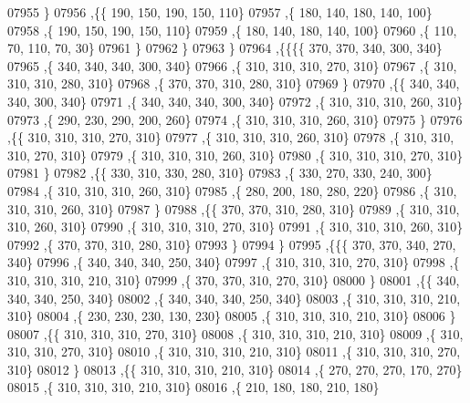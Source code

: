 \begin{DoxyCode}
07955     \}
07956    ,\{\{   190,   150,   190,   150,   110\}
07957     ,\{   180,   140,   180,   140,   100\}
07958     ,\{   190,   150,   190,   150,   110\}
07959     ,\{   180,   140,   180,   140,   100\}
07960     ,\{   110,    70,   110,    70,    30\}
07961     \}
07962    \}
07963   \}
07964  ,\{\{\{\{   370,   370,   340,   300,   340\}
07965     ,\{   340,   340,   340,   300,   340\}
07966     ,\{   310,   310,   310,   270,   310\}
07967     ,\{   310,   310,   310,   280,   310\}
07968     ,\{   370,   370,   310,   280,   310\}
07969     \}
07970    ,\{\{   340,   340,   340,   300,   340\}
07971     ,\{   340,   340,   340,   300,   340\}
07972     ,\{   310,   310,   310,   260,   310\}
07973     ,\{   290,   230,   290,   200,   260\}
07974     ,\{   310,   310,   310,   260,   310\}
07975     \}
07976    ,\{\{   310,   310,   310,   270,   310\}
07977     ,\{   310,   310,   310,   260,   310\}
07978     ,\{   310,   310,   310,   270,   310\}
07979     ,\{   310,   310,   310,   260,   310\}
07980     ,\{   310,   310,   310,   270,   310\}
07981     \}
07982    ,\{\{   330,   310,   330,   280,   310\}
07983     ,\{   330,   270,   330,   240,   300\}
07984     ,\{   310,   310,   310,   260,   310\}
07985     ,\{   280,   200,   180,   280,   220\}
07986     ,\{   310,   310,   310,   260,   310\}
07987     \}
07988    ,\{\{   370,   370,   310,   280,   310\}
07989     ,\{   310,   310,   310,   260,   310\}
07990     ,\{   310,   310,   310,   270,   310\}
07991     ,\{   310,   310,   310,   260,   310\}
07992     ,\{   370,   370,   310,   280,   310\}
07993     \}
07994    \}
07995   ,\{\{\{   370,   370,   340,   270,   340\}
07996     ,\{   340,   340,   340,   250,   340\}
07997     ,\{   310,   310,   310,   270,   310\}
07998     ,\{   310,   310,   310,   210,   310\}
07999     ,\{   370,   370,   310,   270,   310\}
08000     \}
08001    ,\{\{   340,   340,   340,   250,   340\}
08002     ,\{   340,   340,   340,   250,   340\}
08003     ,\{   310,   310,   310,   210,   310\}
08004     ,\{   230,   230,   230,   130,   230\}
08005     ,\{   310,   310,   310,   210,   310\}
08006     \}
08007    ,\{\{   310,   310,   310,   270,   310\}
08008     ,\{   310,   310,   310,   210,   310\}
08009     ,\{   310,   310,   310,   270,   310\}
08010     ,\{   310,   310,   310,   210,   310\}
08011     ,\{   310,   310,   310,   270,   310\}
08012     \}
08013    ,\{\{   310,   310,   310,   210,   310\}
08014     ,\{   270,   270,   270,   170,   270\}
08015     ,\{   310,   310,   310,   210,   310\}
08016     ,\{   210,   180,   180,   210,   180\}

\end{DoxyCode}
